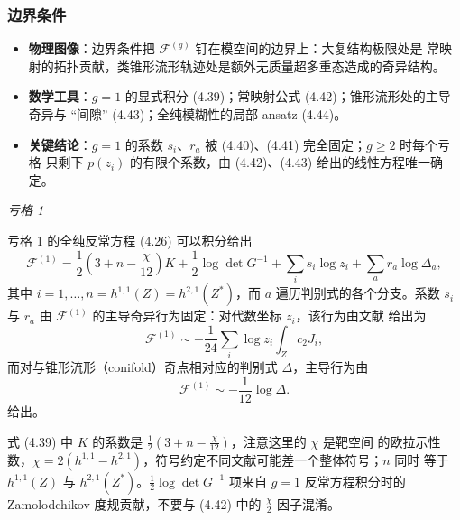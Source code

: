 \subsubsection{边界条件}
\label{sec:4.5.2}

\begin{keytakeaways}
  \begin{itemize}[leftmargin=1.4em,itemsep=2pt,topsep=2pt]
    \item \textbf{物理图像}：边界条件把 $\mathcal{F}^{(g)}$ 钉在模空间的边界上：大复结构极限处是
          常映射的拓扑贡献，类锥形流形轨迹处是额外无质量超多重态造成的奇异结构。
    \item \textbf{数学工具}：$g=1$ 的显式积分 (4.39)；常映射公式 (4.42)；锥形流形处的主导奇异与
          “间隙” (4.43)；全纯模糊性的局部 ansatz (4.44)。
    \item \textbf{关键结论}：$g=1$ 的系数 $s_i$、$r_a$ 被 (4.40)、(4.41) 完全固定；$g\ge2$ 时每个亏格
          只剩下 $p(z_i)$ 的有限个系数，由 (4.42)、(4.43) 给出的线性方程唯一确定。
  \end{itemize}
\end{keytakeaways}

\medskip
\noindent\emph{亏格 1}\par

亏格 1 的全纯反常方程 (4.26) 可以积分给出
\begin{equation}\tag{4.39}
\mathcal{F}^{(1)}
= \frac{1}{2}\left(3+n-\frac{\chi}{12}\right)K
+ \frac{1}{2}\log\det G^{-1}
+ \sum_i s_i\log z_i
+ \sum_a r_a\log\Delta_a ,
\end{equation}
其中 $i=1,\ldots,n=h^{1,1}(Z)=h^{2,1}(Z^*)$，而 $a$ 遍历判别式的各个分支。系数 $s_i$ 与 $r_a$ 由
$\mathcal{F}^{(1)}$ 的主导奇异行为固定：对代数坐标 $z_i$，该行为由文献 \cite{ref19} 给出为
\begin{equation}\tag{4.40}
\mathcal{F}^{(1)} \sim -\frac{1}{24}\sum_i \log z_i \int_Z c_2 J_i ,
\end{equation}
而对与锥形流形（conifold）奇点相对应的判别式 $\Delta$，主导行为由
\begin{equation}\tag{4.41}
\mathcal{F}^{(1)} \sim -\frac{1}{12}\log\Delta .
\end{equation}
给出。

\begin{yizhu}[易错点]
式 (4.39) 中 $K$ 的系数是 $\frac{1}{2}\left(3+n-\frac{\chi}{12}\right)$，注意这里的 $\chi$ 是靶空间
的欧拉示性数，$\chi=2\left(h^{1,1}-h^{2,1}\right)$，符号约定不同文献可能差一个整体符号；$n$ 同时
等于 $h^{1,1}(Z)$ 与 $h^{2,1}(Z^*)$。$\frac{1}{2}\log\det G^{-1}$ 项来自 $g=1$ 反常方程积分时的
Zamolodchikov 度规贡献，不要与 (4.42) 中的 $\frac{\chi}{2}$ 因子混淆。
\end{yizhu}

